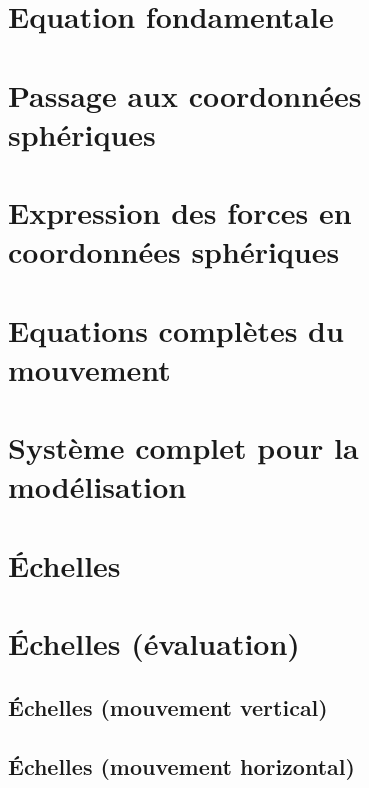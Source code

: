 \documentclass[a4paper,DIV16,10pt]{scrartcl}
\begin{document}
	
\begin{detail}
\newpage
\section{Equation fondamentale}
	
\section{Passage aux coordonnées sphériques}
	
\section{Expression des forces en coordonnées sphériques}
	
\end{detail}

\newpage
\section{Equations complètes du mouvement}


\section{Système complet pour la modélisation}


\newpage 
\section{\'Echelles}


\newpage 
\section{\'Echelles (évaluation)}

	\sk \subsection{\'Echelles (mouvement vertical)}
	

	\sk \subsection{\'Echelles (mouvement horizontal)}
	
\end{document}
